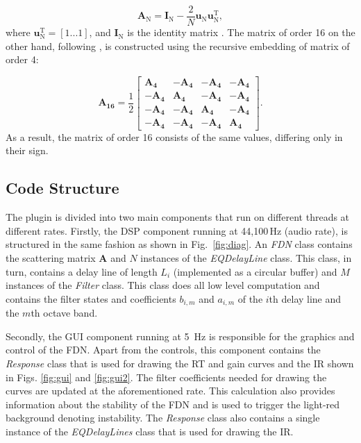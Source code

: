 \documentclass[twoside,a4paper]{article}
\begin{document}
\begin{equation}
\mathbf{A}_\textrm{N} = \mathbf{I}_\textrm{N} - \frac{2}{N} \mathbf{u}_\textrm{N}\mathbf{u}_\textrm{N}^\textrm{T},
\label{eq:house}
\end{equation}
where $\mathbf{u}_\textrm{N}^\textrm{T} = [1...1]$, and $\mathbf{I}_\textrm{N}$ is the identity matrix \cite{Jot:1997:icm}. The matrix of order 16 on the other hand, following \cite{PASPWEB2010}, is constructed using the recursive embedding of matrix of order 4:

\begin{equation}
\mathbf{A_{16}} = \frac{1}{2}
    \begin{bmatrix}
         \mathbf{A_{4}}& -\mathbf{A_{4}}& -\mathbf{A_{4}} & -\mathbf{A_{4}} \\
        -\mathbf{A_{4}} & \mathbf{A_{4}} & -\mathbf{A_{4}}& -\mathbf{A_{4}}\\
        -\mathbf{A_{4}} & -\mathbf{A_{4}} & \mathbf{A_{4}} & -\mathbf{A_{4}} \\
         -\mathbf{A_{4}} & -\mathbf{A_{4}} & -\mathbf{A_{4}} & \mathbf{A_{4}}
    \end{bmatrix}.
    \label{eq:embed}
\end{equation}
As a result, the matrix of order 16 consists of the same values, differing only in their sign.


\subsection{Code Structure}\label{sec:codeStructure}
The plugin is divided into two main components that run on different threads at different rates. Firstly, the DSP component running at 44,100\,Hz (audio rate), is structured in the same fashion as shown in Fig.~\ref{fig:diag}. An \textit{FDN} class contains the scattering matrix $\textbf{A}$ and $N$ instances of the \textit{EQDelayLine} class. This class, in turn, contains a delay line of length $L_i$ (implemented as a circular buffer) and $M$ instances of the \textit{Filter} class. This class does all low level computation and contains the filter states and coefficients $b_{i,m}$ and $a_{i,m}$ of the $i$th delay line and the $m$th octave band.

Secondly, the GUI component running at 5\, Hz is responsible for the graphics and control of the FDN. Apart from the controls, this component contains the \textit{Response} class that is used for drawing the RT and gain curves and the IR shown in Figs. \ref{fig:gui} and \ref{fig:gui2}. The filter coefficients needed for drawing the curves are updated at the aforementioned rate. This calculation also provides information about the stability of the FDN and is used to trigger the light-red background denoting instability. The \textit{Response} class also contains a single instance of the \textit{EQDelayLines} class that is used for drawing the IR.
\end{document}
